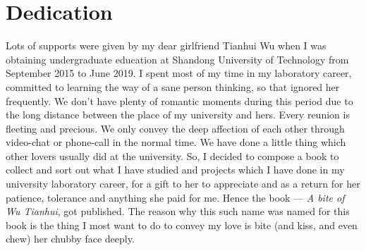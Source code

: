 \documentclass[main.tex]{subfiles}
\begin{document}
\chapter*{Dedication}

\begin{quote}
    \medskip
\end{quote}

Lots of supports were given by my dear girlfriend Tianhui Wu when I was obtaining undergraduate education at Shandong University of Technology from September 2015 to June 2019. I spent most of my time in my laboratory career, committed to learning the way of a sane person thinking, so that ignored her frequently. We don't have plenty of romantic moments during this period due to the long distance between the place of my university and hers. Every reunion is fleeting and precious. We only convey the deep affection of each other through video-chat or phone-call in the normal time. We have done a little thing which other lovers usually did at the university. So, I decided to compose a book to collect and sort out what I have studied and projects which I have done in my university laboratory career, for a gift to her to appreciate and as a return for her patience, tolerance and anything she paid for me. Hence the book --- \textsl{A bite of Wu Tianhui}, got published. The reason why this such name was named for this book is the thing I most want to do to convey my love is bite (and kiss, and even chew) her chubby face deeply. \\

\end{document}
